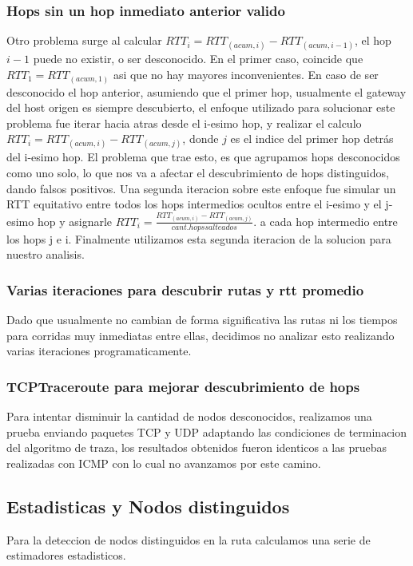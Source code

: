 \subsubsection{Hops sin un hop inmediato anterior valido}
Otro problema surge al calcular $RTT_i = RTT_{(acum, i)} - RTT_{(acum, i-1)}$, 
el hop $i-1$ puede no existir, o ser desconocido. En el primer caso, coincide que $RTT_1 = RTT_{(acum, 1)}$ asi que no hay mayores inconvenientes. En caso de ser desconocido el hop anterior, asumiendo que el primer hop, usualmente el gateway del host origen es siempre descubierto, el enfoque utilizado para solucionar este problema fue iterar hacia atras desde el i-esimo hop, y realizar el calculo $RTT_i = RTT_{(acum, i)} - RTT_{(acum, j)}$, donde $j$ es el indice del primer hop detr\'as del i-esimo hop. El problema que trae esto, es que agrupamos hops desconocidos como uno solo, lo que nos va a afectar el descubrimiento de hops distinguidos, dando falsos positivos. Una segunda iteracion sobre este enfoque fue simular un RTT equitativo entre todos los hops intermedios ocultos entre el i-esimo y el j-esimo hop y asignarle $RTT_i = \frac{RTT_{(acum, i)} - RTT_{(acum, j)}}{cant. hops salteados}$. a cada hop intermedio entre los hops j e i. Finalmente utilizamos esta segunda iteracion de la solucion para nuestro analisis.

\subsubsection{Varias iteraciones para descubrir rutas y rtt promedio}
Dado que usualmente no cambian de forma significativa las rutas ni los tiempos para corridas muy inmediatas entre ellas, decidimos no analizar esto realizando varias iteraciones programaticamente.

\subsubsection{TCPTraceroute para mejorar descubrimiento de hops}
Para intentar disminuir la cantidad de nodos desconocidos, realizamos una prueba enviando paquetes TCP y UDP adaptando las condiciones de terminacion del algoritmo de traza, los resultados obtenidos fueron identicos a las pruebas realizadas con ICMP con lo cual no avanzamos por este camino.

\subsection{Estadisticas y Nodos distinguidos}
Para la deteccion de nodos distinguidos en la ruta calculamos una serie de estimadores estadisticos.
